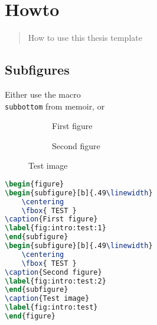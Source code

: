 \chapter{Howto}
\label{c:howto}

\begin{abstract}%
    How to use this thesis template
\end{abstract}

\section{Subfigures}
\label{s:howto:subfigures}
Either use the macro \texttt{\\subbottom} from memoir, or 

\begin{figure}
\begin{subfigure}[b]{.49\linewidth} 
    \centering
\caption{First figure}
\label{fig:intro:test:1}
\end{subfigure}
\begin{subfigure}[b]{.49\linewidth} 
    \centering
\caption{Second figure}
\label{fig:intro:test:2}
\end{subfigure}
\caption{Test image}
\label{fig:intro:test}
\end{figure}

\begin{lstlisting}[language=tex]
\begin{figure}
\begin{subfigure}[b]{.49\linewidth} 
    \centering
    \fbox{ TEST }
\caption{First figure}
\label{fig:intro:test:1}
\end{subfigure}
\begin{subfigure}[b]{.49\linewidth} 
    \centering
    \fbox{ TEST }
\caption{Second figure}
\label{fig:intro:test:2}
\end{subfigure}
\caption{Test image}
\label{fig:intro:test}
\end{figure}
\end{lstlisting}

